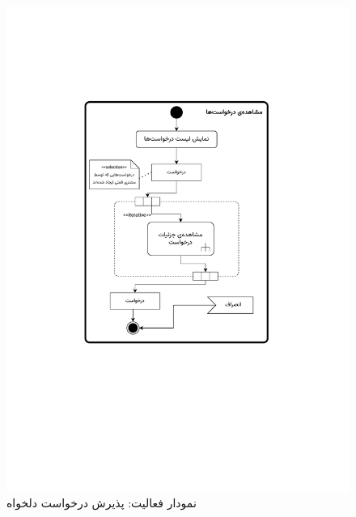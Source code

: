 \begin{figure}[ht!]
	\centering
	\includegraphics[scale=0.8, page=5]{figs/OOD-activity11-20.pdf}
	\caption{نمودار فعالیت: پذیرش درخواست دلخواه}
\end{figure}
\FloatBarrier
\newpage

